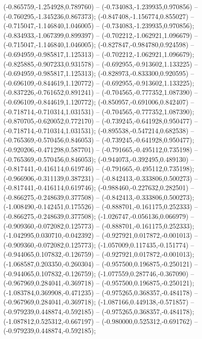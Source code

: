  (-0.865759,-1.254928,0.789760) -- (-0.734083,-1.239935,0.970856) -- (-0.760295,-1.345236,0.867373);
 (-0.847408,-1.156774,0.855027) -- (-0.715047,-1.146840,1.046005) -- (-0.734083,-1.239935,0.970856);
 (-0.834933,-1.067399,0.899397) -- (-0.702212,-1.062921,1.096679) -- (-0.715047,-1.146840,1.046005);
 (-0.827847,-0.984780,0.924598) -- (-0.694959,-0.985817,1.125313) -- (-0.702212,-1.062921,1.096679);
 (-0.825885,-0.907233,0.931578) -- (-0.692955,-0.913602,1.133225) -- (-0.694959,-0.985817,1.125313);
 (-0.828973,-0.833300,0.920595) -- (-0.696109,-0.844619,1.120772) -- (-0.692955,-0.913602,1.133225);
 (-0.837226,-0.761652,0.891241) -- (-0.704565,-0.777352,1.087390) -- (-0.696109,-0.844619,1.120772);
 (-0.850957,-0.691006,0.842407) -- (-0.718714,-0.710314,1.031531) -- (-0.704565,-0.777352,1.087390);
 (-0.870705,-0.620052,0.772170) -- (-0.739245,-0.641928,0.950477) -- (-0.718714,-0.710314,1.031531);
 (-0.895538,-0.547214,0.682538) -- (-0.765369,-0.570456,0.846053) -- (-0.739245,-0.641928,0.950477);
 (-0.920206,-0.471298,0.587701) -- (-0.791665,-0.495112,0.735198) -- (-0.765369,-0.570456,0.846053);
 (-0.944073,-0.392495,0.489130) -- (-0.817441,-0.416114,0.619746) -- (-0.791665,-0.495112,0.735198);
 (-0.966906,-0.311139,0.387231) -- (-0.842413,-0.333806,0.500273) -- (-0.817441,-0.416114,0.619746);
 (-0.988460,-0.227632,0.282501) -- (-0.866275,-0.248639,0.377508) -- (-0.842413,-0.333806,0.500273);
 (-1.008490,-0.142451,0.175526) -- (-0.888701,-0.161175,0.252333) -- (-0.866275,-0.248639,0.377508);
 (-1.026747,-0.056136,0.066979) -- (-0.909360,-0.072082,0.125773) -- (-0.888701,-0.161175,0.252333);
 (-1.042995,0.030710,-0.042392) -- (-0.927921,0.017872,-0.001013) -- (-0.909360,-0.072082,0.125773);
 (-1.057009,0.117435,-0.151774) -- (-0.944065,0.107832,-0.126759) -- (-0.927921,0.017872,-0.001013);
 (-1.068587,0.203350,-0.260304) -- (-0.957500,0.196875,-0.250121) -- (-0.944065,0.107832,-0.126759);
 (-1.077559,0.287746,-0.367090) -- (-0.967969,0.284041,-0.369718) -- (-0.957500,0.196875,-0.250121);
 (-1.083784,0.369908,-0.471235) -- (-0.975265,0.368357,-0.484178) -- (-0.967969,0.284041,-0.369718);
 (-1.087166,0.449138,-0.571857) -- (-0.979239,0.448874,-0.592185) -- (-0.975265,0.368357,-0.484178);
 (-1.087812,0.525312,-0.667197) -- (-0.980000,0.525312,-0.691762) -- (-0.979239,0.448874,-0.592185);
